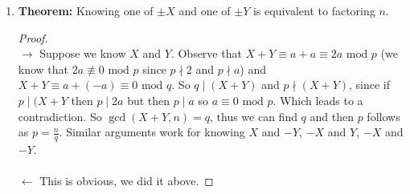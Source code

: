\documentclass[class=article, crop=false]{standalone}
\begin{document}
\begin{enumerate}
\begin{proof}
\begin{itemize}
			\item We solve,
			\begin{align*}
				x&\equiv A^{\frac{p+1}{4}}\mbox{ mod }p \\
				x&\equiv -A^{\frac{q+1}{4}}\mbox{ mod }q
			\end{align*}
			Call that result $Y$, this also gives us $-Y$.
		\end{itemize}
		So we have 4 solutions.
	\end{proof}

	\noindent\textbf{Ex.} Supose $p=31,q=43$ so $n=pq=1333$.
	Suppose we know $x^2\equiv 669\mbox{ mod }1333$ has solutions. Find them!
	\begin{itemize}
		\item Solve,
		\begin{align*}
			x&\equiv 669^{(31+1)/4}\equiv 7\mbox{ mod }31 \\
			x&\equiv 669^{(43+1)/4}\equiv 14\mbox{ mod }43
		\end{align*}
		Which gives us $X=100\mbox{ mod }1333$ and $-X=100\mbox{ mod }1333$.
		
		\item Solve
		\begin{align*}
			x&\equiv 669^{(31+1)/4}\equiv 7\mbox{ mod }31 \\
			x&\equiv -669^{(43+1)/4}\equiv -14\mbox{ mod }43
		\end{align*}
		Which gives us $Y=1061\mbox{ mod }1333$ and $-X=-1061\equiv 272\mbox{ mod }1333$.
	\end{itemize}
	So our 4 solutions are; $100,-100,1061,272$.

	\item \textbf{Theorem:}
	Knowing one of $\pm X$ and one of $\pm Y$ is equivalent to factoring $n$.
	\begin{proof}
		$ $\\
		$\rightarrow$ Suppose we know $X$ and $Y$. Observe that $X+Y\equiv a+a\equiv 2a\mbox{ mod }p$
		(we know that $2a\not\equiv 0\mbox{ mod }p$ since $p\nmid 2$ and $p\nmid a$)
		and $X+Y\equiv a+(-a)\equiv 0\mbox{ mod }q$.
		So $q\mid (X+Y)$ and $p\nmid (X+Y)$, since if $p\mid(X+Y$ then $p\mid 2a$
		but then $p\mid a$ so $a\equiv 0\mbox{ mod }p$. Which leads to a contradiction.
		So $\gcd(X+Y,n)=q$, thus we can find $q$ and then $p$ follows as $p=\frac{n}{q}$.
		Similar arguments work for knowing $X$ and $-Y$, $-X$ and $Y$, $-X$ and $-Y$. \\\\
		$\leftarrow$ This is obvious, we did it above.
	\end{proof}


\end{enumerate}
\end{document}
